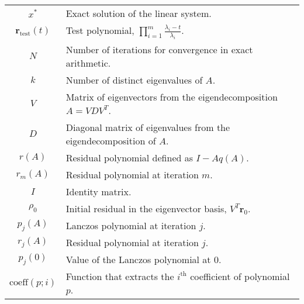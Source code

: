\begin{longtable}{c p{10cm}}
    $x^*$                           & Exact solution of the linear system.                                                                          \\
    $\mathbf{r}_{\textrm{test}}(t)$ & Test polynomial, $\prod_{i=1}^m \frac{\lambda_i - t}{\lambda_i}$.                                             \\
    $N$                             & Number of iterations for convergence in exact arithmetic.                                                     \\
    $k$                             & Number of distinct eigenvalues of $A$.                                                                        \\
    $V$                             & Matrix of eigenvectors from the eigendecomposition $A = VDV^T$.                                               \\
    $D$                             & Diagonal matrix of eigenvalues from the eigendecomposition of $A$.                                            \\
    $r(A)$                          & Residual polynomial defined as $I - Aq(A)$.                                                                   \\
    $r_m(A)$                        & Residual polynomial at iteration $m$.                                                                         \\
    $I$                             & Identity matrix.                                                                                              \\
    $\rho_0$                        & Initial residual in the eigenvector basis, $V^T\mathbf{r}_0$.                                                 \\
    $p_j(A)$                        & Lanczos polynomial at iteration $j$.                                                                          \\
    $r_j(A)$                        & Residual polynomial at iteration $j$.                                                                         \\
    $p_j(0)$                        & Value of the Lanczos polynomial at $0$.                                                                       \\
    $\text{coeff}(p;i)$             & Function that extracts the $i^{\text{th}}$ coefficient of polynomial $p$.                                     \\

\end{longtable}
